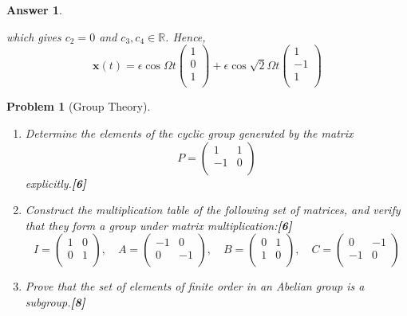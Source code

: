 \documentclass[a4paper]{article}
\newtheorem{ans}{Answer}[section]
\theoremstyle{new}
\newtheorem{qns}{Problem}[section]
\begin{document}
\begin{ans}
\begin{enumerate}[label=(\alph*)]
which gives $c_2=0$ and $c_3,c_4\in\mathbb{R}$. Hence,
$$\mathbf{x}(t)=\epsilon\cos\Omega t\begin{pmatrix}1\\0\\1\\\end{pmatrix}+\epsilon\cos\sqrt{2}\Omega t\begin{pmatrix}1\\-1\\1\\\end{pmatrix}$$
\end{enumerate}
\end{ans}
\newpage
\begin{qns}[Group Theory]\leavevmode
\begin{enumerate}[label=(\alph*)]
\item Determine the elements of the cyclic group generated by the matrix
$$P=\begin{pmatrix}1&1\\-1&0\\\end{pmatrix}$$
explicitly.\hfill\textbf{[6]}
\item Construct the multiplication table of the following set of matrices, and verify that they form a group under matrix multiplication:\hfill\textbf{[6]}
$$I=\begin{pmatrix}1&0\\0&1\\\end{pmatrix},\quad A=\begin{pmatrix}-1&0\\0&-1\\\end{pmatrix},\quad B=\begin{pmatrix}0&1\\1&0\\\end{pmatrix},\quad C=\begin{pmatrix}0&-1\\-1&0\\\end{pmatrix}$$
\item Prove that the set of elements of finite order in an Abelian group is a subgroup.\hfill\textbf{[8]}
\end{enumerate}
\end{qns}
\end{document}
